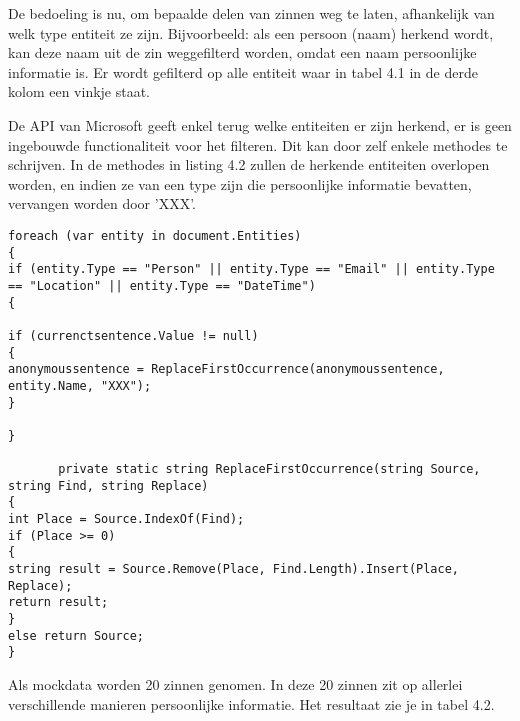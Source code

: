 De bedoeling is nu, om bepaalde delen van zinnen weg te laten, afhankelijk van welk type entiteit ze zijn. 
Bijvoorbeeld: als een persoon (naam) herkend wordt, kan deze naam uit de zin weggefilterd worden, omdat een naam persoonlijke informatie is. 
Er wordt gefilterd op alle entiteit waar in tabel 4.1 in de derde kolom een vinkje staat. 

De API van Microsoft geeft enkel terug welke entiteiten er zijn herkend, er is geen ingebouwde functionaliteit voor het filteren. Dit kan door zelf enkele methodes te schrijven. In de methodes in listing 4.2 zullen de herkende entiteiten overlopen worden, en indien ze van een type zijn die persoonlijke informatie bevatten, vervangen worden door 'XXX'. 
\begin{lstlisting}[frame=single, caption={Gevonden, persoonlijke informatie bevattende, entiteiten filteren}, captionpos=b]
                foreach (var entity in document.Entities)
{
if (entity.Type == "Person" || entity.Type == "Email" || entity.Type == "Location" || entity.Type == "DateTime")
{

if (currenctsentence.Value != null)
{
anonymoussentence = ReplaceFirstOccurrence(anonymoussentence, entity.Name, "XXX");
} 

}

       private static string ReplaceFirstOccurrence(string Source, string Find, string Replace)
{
int Place = Source.IndexOf(Find);
if (Place >= 0)
{
string result = Source.Remove(Place, Find.Length).Insert(Place, Replace);
return result;
}
else return Source;
}
\end{lstlisting}

Als mockdata worden 20 zinnen genomen. In deze 20 zinnen zit op allerlei verschillende manieren persoonlijke informatie. Het resultaat zie je in tabel 4.2.

